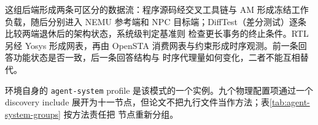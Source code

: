 \documentclass[UTF8,a4paper,zihao=-4,oneside]{ctexart}
\begin{document}
\newcommand{\TableExecutionBackendArtifacts}{%
\begin{table}[htbp]
  \centering
  \small
  \caption{执行面主要工程后端、原始产物及其证据用途}
  \label{tab:execution-backend-artifacts}
  \begin{tabularx}{\linewidth}{@{}L{0.18\linewidth}L{0.25\linewidth}L{0.29\linewidth}Y@{}}
    \toprule
    后端或工具 & 在本工程中的角色 & 执行面直接产生的原始产物 & 证据面可支持的结论与边界 \\
    \midrule
    AM 与 RISC-V 交叉工具链 & AM（Abstract Machine，抽象计算机运行时与平台适配层）把同一测试程序适配到不同后端；交叉编译器生成 RISC-V 目标码 & 带哈希的 ELF/二进制镜像、反汇编、链接布局和构建配置 & 冻结 workload 身份并保证两端消费同一程序；仅构建成功不证明程序已在任一处理器上正确运行 \\
    NEMU & 本工程的 RISC-V 软件指令集模拟器，在 DiffTest 或系统启动中作为功能参考端 & 退休指令与架构状态序列、异常/设备事件、参考端控制台和终止状态 & 为 NPC 的指令级状态比较提供参考，也可建立 Linux 参考路径；NEMU 自身通过不能证明 RTL target 正确 \\
    NPC/Verilator & 把本地处理器 RTL 编译为可执行仿真目标，是被验证的 target 而非参考模型 & target 退休流、周期计数、总线与设备事务、波形、控制台日志及终止 marker & 支持局部 TB、DiffTest 和 Ubuntu 系统事务；只有与冻结参考、配置及 oracle 同时闭合后才能形成限定 PASS \\
    Yosys/OpenSTA & 分别承担 RTL 逻辑综合与静态时序分析，观察设计实现结构和时序约束 & 门级网表、单元/位数统计、关键路径、时序裕量及约束覆盖报告 & 支持结构筛选和代理时序比较；缺少真实宏、寄生参数、完整 I/O 与工艺角时，PPA 必须保持 UNQUALIFIED \\
    JDK/Chisel 工具链 & 在需要 ysyxSoC/Chisel 生成路径时，把 Scala/Chisel 描述展开为可供后续编译的 RTL & 生成的 Verilog/SystemVerilog、SoC wrapper 与生成日志 & 证明生成入口和接口产物可复现；不替代生成 RTL 的仿真、综合或接口验收 \\
    \bottomrule
  \end{tabularx}
\end{table}
}%

这组后端形成两条可区分的数据流：程序源码经交叉工具链与 AM 形成冻结工作负载，随后分别进入
NEMU 参考端和 NPC 目标端；DiffTest（差分测试）逐条比较两端退休后的架构状态，系统级判定基准则
检查更长事务的终止条件。RTL 另经 Yosys
形成网表，再由 OpenSTA 消费网表与约束形成时序观测。前一条回答功能状态是否一致，后一条回答结构与
时序代理量如何变化，二者不能互相替代。

环境自身的 \texttt{agent-system} profile 是该模式的一个实例。九个物理配置项通过一个 discovery
include 展开为十一节点，但论文不把九行文件当作方法；表\ref{tab:agent-system-groups} 按方法责任把
节点重新分组。
\end{document}
